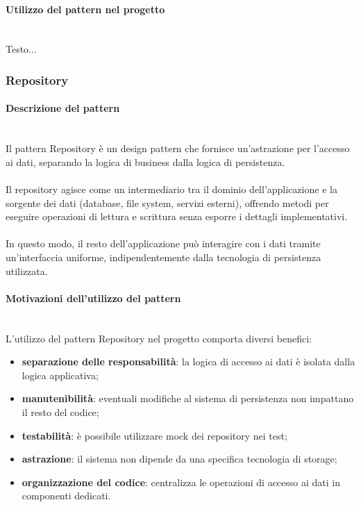 \documentclass[a4paper,12pt]{article}
\begin{document}
{{{                \paragraph{ Utilizzo del pattern nel progetto}\mbox{}\\
                Testo...
            }
            \subsubsection{Repository} {
                \paragraph{Descrizione del pattern}\mbox{}\\
                Il pattern Repository è un design pattern che fornisce un’astrazione per l’accesso ai dati, separando la logica di business dalla logica di persistenza.\\
                \\
                Il repository agisce come un intermediario tra il dominio dell’applicazione e la sorgente dei dati (database, file system, servizi esterni), offrendo metodi per eseguire operazioni di lettura e scrittura senza esporre i dettagli implementativi.\\
                \\
                In questo modo, il resto dell’applicazione può interagire con i dati tramite un’interfaccia uniforme, indipendentemente dalla tecnologia di persistenza utilizzata.
                
                \paragraph{Motivazioni dell’utilizzo del pattern}\mbox{}\\
                L’utilizzo del pattern Repository nel progetto comporta diversi benefici:
                \begin{itemize}
                    \item \textbf{separazione delle responsabilità}: la logica di accesso ai dati è isolata dalla logica applicativa;
                    \item \textbf{manutenibilità}: eventuali modifiche al sistema di persistenza non impattano il resto del codice;
                    \item \textbf{testabilità}: è possibile utilizzare mock dei repository nei test;
                    \item \textbf{astrazione}: il sistema non dipende da una specifica tecnologia di storage;
                    \item \textbf{organizzazione del codice}: centralizza le operazioni di accesso ai dati in componenti dedicati.
                \end{itemize}
                
}}}
\end{document}

